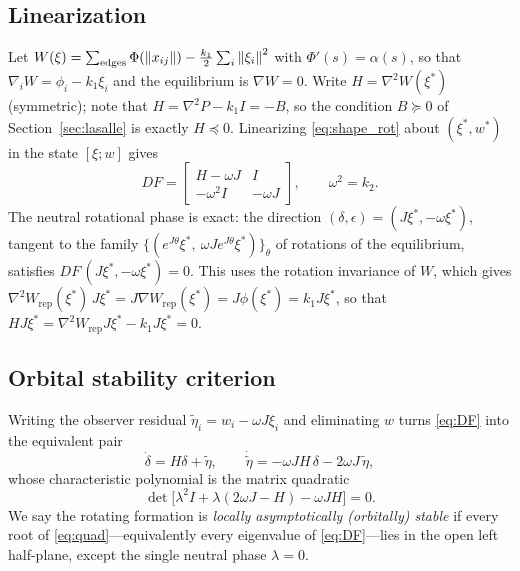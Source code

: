 \subsection{Linearization}
\label{sec:lyaprot}

Let $W(\xi)=\sum_{\text{edges}}\Phi(\left\| x_{ij} \right\|)-\tfrac{k_1}{2}\sum_i\left\| \xi_i \right\|^2$ with
$\Phi'(s)=\alpha(s)$, so that $\nabla_i W=\phi_i-k_1\xi_i$ and the equilibrium is $\nabla W=0$. Write
$H=\nabla^2 W(\xi^*)$ (symmetric); note that $H=\nabla^2P-k_1I=-B$, so the condition $B\succeq0$ of Section~\ref{sec:lasalle} is exactly $H\preceq0$. Linearizing \eqref{eq:shape_rot} about $(\xi^*,w^*)$ in the state
$[\xi;w]$ gives
\begin{equation}
  DF=\begin{bmatrix} H-\omega J & I\\ -\omega^2 I & -\omega J\end{bmatrix},
  \qquad \omega^2=k_2 .
  \label{eq:DF}
\end{equation}
The neutral rotational phase is exact: the direction $(\delta,\epsilon)=(J\xi^*,-\omega\xi^*)$,
tangent to the family $\{(e^{J\theta}\xi^*,\ \omega Je^{J\theta}\xi^*)\}_{\theta}$ of rotations of
the equilibrium, satisfies $DF\,(J\xi^*,-\omega\xi^*)=0$. This uses the rotation invariance of $W$,
which gives $\nabla^2 W_{\mathrm{rep}}(\xi^*)\,J\xi^*=J\nabla W_{\mathrm{rep}}(\xi^*)
=J\phi(\xi^*)=k_1J\xi^*$, so that $HJ\xi^*=\nabla^2 W_{\mathrm{rep}}J\xi^*-k_1J\xi^*=0$.

\subsection{Orbital stability criterion}
\label{sec:local}

Writing the observer residual $\tilde\eta_i=w_i-\omega J\xi_i$ and eliminating $w$ turns
\eqref{eq:DF} into the equivalent pair
\begin{equation}
  \dot\delta=H\delta+\tilde\eta,\qquad
  \dot{\tilde\eta}=-\omega JH\,\delta-2\omega J\,\tilde\eta,
  \label{eq:lin2}
\end{equation}
whose characteristic polynomial is the matrix quadratic
\begin{equation}
  \det\bigl[\lambda^2 I+\lambda(2\omega J-H)-\omega JH\bigr]=0 .
  \label{eq:quad}
\end{equation}
We say the rotating formation is \emph{locally asymptotically (orbitally) stable} if every root of
\eqref{eq:quad}---equivalently every eigenvalue of \eqref{eq:DF}---lies in the open left half-plane,
except the single neutral phase $\lambda=0$.

